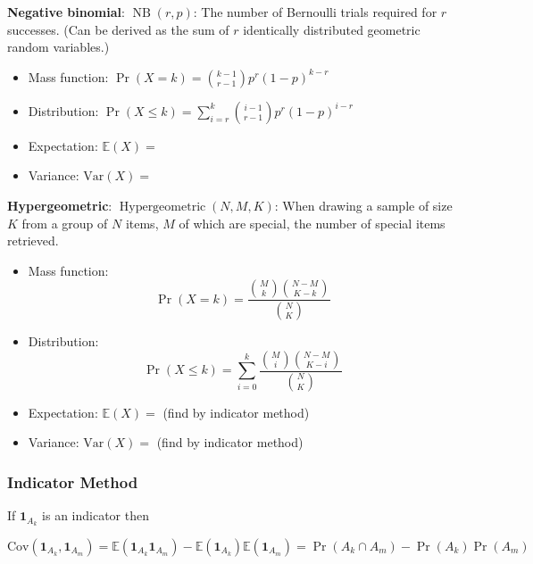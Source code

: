 \documentclass{article}
\newcommand{\E}{\mathbb{E}}
\newcommand{\Var}{\mathrm{Var}}
\newcommand{\Cov}{\mathrm{Cov}}
\begin{document}
\textbf{Negative binomial}: \( \operatorname{NB}(r, p)\): The number of Bernoulli trials required for \(r\) successes. (Can be derived as the sum of \(r\) identically distributed geometric random variables.)

\begin{itemize}

\item Mass function: \(\Pr(X = k) =  \binom{k-1}{r-1} p^r (1-p)^{k-r}\)

\item Distribution: \(\Pr(X \leq k) = \sum_{i=r}^k \binom{i-1}{r-1} p^r (1-p)^{i-r} \)

\item Expectation: \(\E(X) = \)

\item Variance: \(\Var(X) = \)

\end{itemize}


\textbf{Hypergeometric}: \( \operatorname{Hypergeometric}(N, M, K)\): When drawing a sample of size \(K\) from a group of \(N\) items, \(M\) of which are special, the number of special items retrieved.

\begin{itemize}

\item Mass function: \[\Pr(X = k) = \frac{\binom{M}{k} \binom{N-M}{K-k}}{\binom{N}{K}} \]

\item Distribution: \[\Pr(X \leq k) = \sum_{i=0}^k \frac{\binom{M}{i} \binom{N-M}{K-i}}{\binom{N}{K}}  \]

\item Expectation: \(\E(X) = \) (find by indicator method)

\item Variance: \(\Var(X) = \) (find by indicator method)

\end{itemize}


\subsubsection{Indicator Method}

If \(\boldsymbol{1}_{A_k}\) is an indicator then

\[
\Cov(\boldsymbol{1}_{A_k}, \boldsymbol{1}_{A_m}) = \E(\boldsymbol{1}_{A_k} \boldsymbol{1}_{A_m}) - \E(\boldsymbol{1}_{A_k}) \E(\boldsymbol{1}_{A_m}) = \Pr(A_k \cap A_m) - \Pr(A_k) \Pr(A_m)
\]
\end{document}
